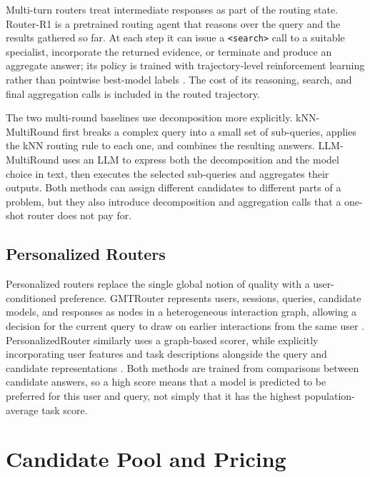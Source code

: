 Multi-turn routers treat intermediate responses as part of the routing state. Router-R1 is a pretrained routing agent that reasons over the query and the results gathered so far. At each step it can issue a \texttt{<search>} call to a suitable specialist, incorporate the returned evidence, or terminate and produce an aggregate answer; its policy is trained with trajectory-level reinforcement learning rather than pointwise best-model labels \citep{zhang2025router}. The cost of its reasoning, search, and final aggregation calls is included in the routed trajectory.

The two multi-round baselines use decomposition more explicitly. kNN-MultiRound first breaks a complex query into a small set of sub-queries, applies the kNN routing rule to each one, and combines the resulting answers. LLM-MultiRound uses an LLM to express both the decomposition and the model choice in text, then executes the selected sub-queries and aggregates their outputs. Both methods can assign different candidates to different parts of a problem, but they also introduce decomposition and aggregation calls that a one-shot router does not pay for.

\subsection{Personalized Routers}

Personalized routers replace the single global notion of quality with a user-conditioned preference. GMTRouter represents users, sessions, queries, candidate models, and responses as nodes in a heterogeneous interaction graph, allowing a decision for the current query to draw on earlier interactions from the same user \citep{xie2025gmtrouter}. PersonalizedRouter similarly uses a graph-based scorer, while explicitly incorporating user features and task descriptions alongside the query and candidate representations \citep{dai2025personalizedrouter}. Both methods are trained from comparisons between candidate answers, so a high score means that a model is predicted to be preferred for this user and query, not simply that it has the highest population-average task score.





\section{Candidate Pool and Pricing} \label{app:pricing}

